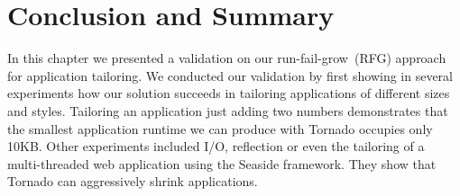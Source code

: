 %
%
%



\section{Conclusion and Summary}

In this chapter we presented a validation on our run-fail-grow~(RFG) approach for application tailoring. We conducted our validation by first showing in several experiments how our solution succeeds in tailoring applications of different sizes and styles. Tailoring an application just adding two numbers demonstrates that the smallest application runtime we can produce with Tornado occupies only 10KB. Other experiments included I/O, reflection or even the tailoring of a multi-threaded web application using the Seaside framework. They show that Tornado can aggressively shrink applications.

